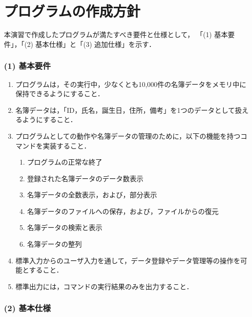 \section{プログラムの作成方針}\label{sec:plan}

本演習で作成したプログラムが満たすべき要件と仕様として，
「(1) 基本要件」，「(2) 基本仕様」と「(3) 追加仕様」を示す．

\subsubsection*{(1) 基本要件}

\begin{enumerate}
  \setlength{\parskip}{0em} \setlength{\itemsep}{0.25em}  %
    \item プログラムは，その実行中，少なくとも10,000件の名簿データをメモリ中に保持できるようにすること．
    \item 名簿データは，「ID，氏名，誕生日，住所，備考」を1つのデータとして扱えるようにすること．
    \item プログラムとしての動作や名簿データの管理のために，以下の機能を持つコマンドを実装すること．
    \begin{enumerate} \setlength{\parskip}{0em} \setlength{\itemsep}{0.25em}
        \item プログラムの正常な終了
        \item 登録された名簿データのデータ数表示
        \item 名簿データの全数表示，および，部分表示
        \item 名簿データのファイルへの保存，および，ファイルからの復元
        \item 名簿データの検索と表示
        \item 名簿データの整列
    \end{enumerate}
    \item 標準入力からのユーザ入力を通して，データ登録やデータ管理等の操作を可能とすること．
    \item 標準出力には，コマンドの実行結果のみを出力すること．
\end{enumerate}

\subsubsection*{(2) 基本仕様}

